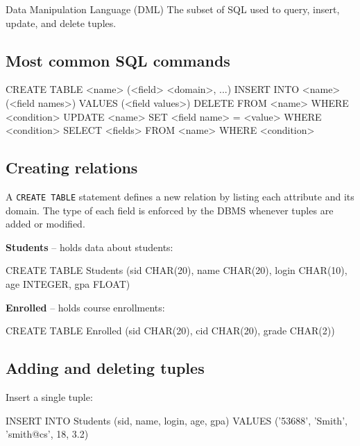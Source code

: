 \documentclass[../../dis.tex]{subfiles}
\begin{document}
\begin{concept}{Data Manipulation Language (DML)}
The subset of SQL used to query, insert, update, and delete tuples.
\end{concept}

\subsection{Most common SQL commands}
\begin{sql}
    CREATE TABLE <name> (<field> <domain>, ...)
    INSERT INTO <name> (<field names>) VALUES (<field values>)
    DELETE FROM <name> WHERE <condition>
    UPDATE <name> SET <field name> = <value> WHERE <condition>
    SELECT <fields> FROM <name> WHERE <condition>
\end{sql}

\subsection{Creating relations}
A \lstinline[style=SQLStyle]{CREATE TABLE} statement defines a new relation by listing each attribute and its domain. The type of each field is enforced by the DBMS whenever tuples are added or modified.

\begin{minipage}[t]{0.48\textwidth}
\textbf{Students} -- holds data about students:
\begin{sql}
    CREATE TABLE Students
      (sid   CHAR(20),
       name  CHAR(20),
       login CHAR(10),
       age   INTEGER,
       gpa   FLOAT)
\end{sql}
\end{minipage}
\hfill
\begin{minipage}[t]{0.48\textwidth}
\textbf{Enrolled} -- holds course enrollments:
\begin{sql}
    CREATE TABLE Enrolled
      (sid   CHAR(20),
       cid   CHAR(20),
       grade CHAR(2))
\end{sql}
\end{minipage}

\subsection{Adding and deleting tuples}
Insert a single tuple:
\begin{sql}
    INSERT INTO Students (sid, name, login, age, gpa)
    VALUES ('53688', 'Smith', 'smith@cs', 18, 3.2)
\end{sql}
\end{document}
